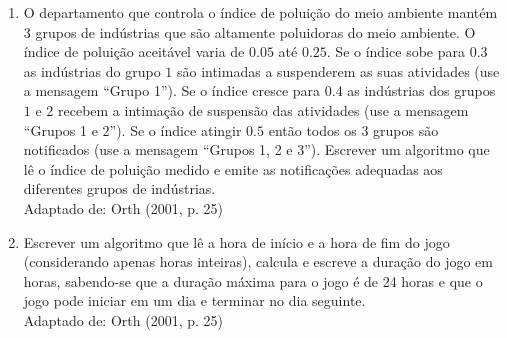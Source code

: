 \documentclass[onecolumn,a4paper,10pt]{report}
\newcommand{\+}{\, + \,}
\newcommand{\<}{\hspace*{-0.4cm}}
\begin{document}
\begin{enumerate}[1.]
\item O departamento que controla o índice de poluição do meio ambiente mantém $3$ grupos de indústrias que são altamente poluidoras do meio ambiente. O índice de poluição aceitável varia de $0.05$ até $0.25$. Se o índice sobe para $0.3$ as indústrias do grupo $1$ são intimadas a suspenderem as suas atividades (use a mensagem ``Grupo 1''). Se o índice cresce para $0.4$ as indústrias dos grupos $1$ e $2$ recebem a intimação de suspensão das atividades (use a mensagem ``Grupos 1 e 2''). Se o índice atingir $0.5$ então todos os $3$ grupos são notificados  (use a mensagem ``Grupos 1, 2 e 3''). Escrever um algoritmo que lê o índice de poluição medido e emite as notificações adequadas aos diferentes grupos de indústrias.\\
{\tiny Adaptado de: Orth (2001, p. 25)}

\item Escrever um algoritmo que lê a hora de início e a hora de fim do jogo (considerando apenas horas inteiras), calcula e escreve a duração do jogo em horas, sabendo-se que a duração máxima para o jogo é de 24 horas e que o jogo pode iniciar em um dia e terminar no dia seguinte.\\
{\tiny Adaptado de: Orth (2001, p. 25)}


\end{enumerate}
\end{document}
